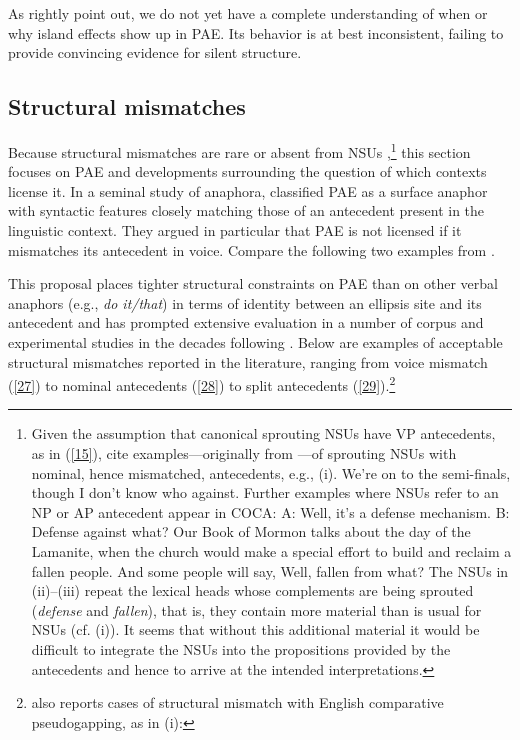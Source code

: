 {
\zl
%

As \citet{Ginzburg2018} rightly point out, we do not yet have a complete understanding of when or why island effects show up in PAE. Its behavior is at best inconsistent, failing to provide convincing evidence for silent structure.


\subsection{Structural mismatches}
\label{sec-structural-mismatches}

Because structural mismatches are rare or absent from NSUs \citep[see][]{Merchant2005a, Merchant2013},\footnote{Given the assumption that canonical sprouting NSUs have VP antecedents, as in (\ref{15}), \citet{Ginzburg2018} cite examples---originally from \citet{Beecher2008}---of sprouting NSUs with nominal, hence mismatched, antecedents, e.g., (i).
	\ea We're on to the semi-finals, though I don't know who against.\z
%
	Further examples where NSUs refer to an NP or AP antecedent appear in COCA:
%
	\ea  A: Well, it's a defense mechanism. B: Defense against what?\z
	\ea Our Book of Mormon talks about the day of the Lamanite, when the church would make a special effort to build and reclaim a fallen people. And some people will say, Well, fallen from what? \z
%
	The NSUs in (ii)--(iii) repeat the lexical heads whose complements are being sprouted (\textit{defense} and \textit{fallen}), that is, they contain more material than is usual for NSUs (cf. (i)). It seems that without this additional material it would be difficult to integrate the NSUs into the propositions provided by the antecedents and hence to arrive at the intended interpretations.} this section focuses on PAE and developments surrounding the question of which contexts license it. In a seminal study of anaphora, \citet{Hankamer1976} classified PAE as a surface anaphor with syntactic features closely matching those of an antecedent present in the linguistic context. They argued in particular that PAE is not licensed if it mismatches its antecedent in voice. Compare the following two examples from \citet[327]{Hankamer1976}.

\eal
{}
\zl
This proposal places tighter structural constraints on PAE than on other verbal anaphors (e.g., \textit{do it/that}) in terms of identity between an ellipsis site and its antecedent and has prompted extensive evaluation in a number of corpus and experimental studies in the decades following \citet{Hankamer1976}. Below are examples of acceptable structural mismatches reported in the literature, ranging from voice mismatch (\ref{27}) to nominal antecedents (\ref{28}) to split antecedents (\ref{29}).\footnote{\citet{Miller2014} also reports cases of structural mismatch with English comparative pseudogapping, as in (i):

}}
